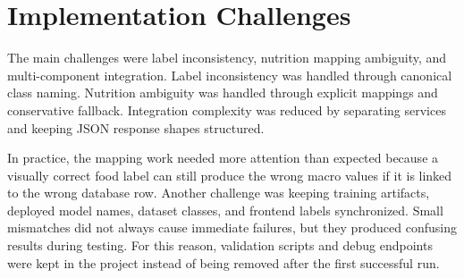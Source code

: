 \section{Implementation Challenges}

The main challenges were label inconsistency, nutrition mapping ambiguity, and multi-component integration. Label inconsistency was handled through canonical class naming. Nutrition ambiguity was handled through explicit mappings and conservative fallback. Integration complexity was reduced by separating services and keeping JSON response shapes structured.

In practice, the mapping work needed more attention than expected because a visually correct food label can still produce the wrong macro values if it is linked to the wrong database row. Another challenge was keeping training artifacts, deployed model names, dataset classes, and frontend labels synchronized. Small mismatches did not always cause immediate failures, but they produced confusing results during testing. For this reason, validation scripts and debug endpoints were kept in the project instead of being removed after the first successful run.
